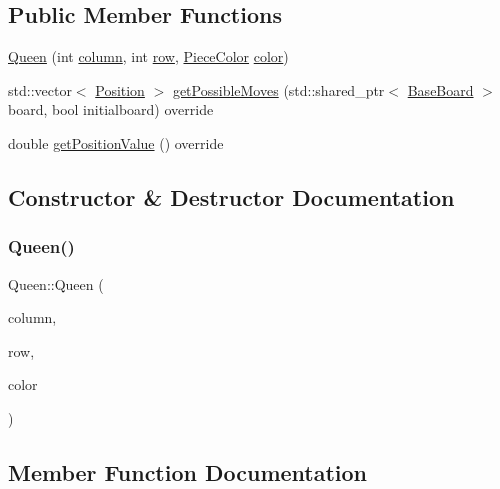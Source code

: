 \subsection*{Public Member Functions}
\begin{DoxyCompactItemize}
\item 
\hyperlink{class_queen_aa8675f82d1d05e7e457f94b897674ace}{Queen} (int \hyperlink{class_piece_aa8f39e11280395103164f6ae07398c82}{column}, int \hyperlink{class_piece_ac6ef7c474f20562cb629c2452ce0631d}{row}, \hyperlink{_piece_8h_ad7595c48bb74c0dd2a7648712a2d4985}{Piece\+Color} \hyperlink{class_piece_a8dfe0501fe95a1a7618cf5ad3b9fda69}{color})
\item 
std\+::vector$<$ \hyperlink{struct_position}{Position} $>$ \hyperlink{class_queen_a54461f7bace6797676679ad1da5901d3}{get\+Possible\+Moves} (std\+::shared\+\_\+ptr$<$ \hyperlink{class_base_board}{Base\+Board} $>$ board, bool initialboard) override
\item 
double \hyperlink{class_queen_aa2ca0d72a74a245470f502a82eaf1052}{get\+Position\+Value} () override
\end{DoxyCompactItemize}


\subsection{Constructor \& Destructor Documentation}
\mbox{\label{class_queen_aa8675f82d1d05e7e457f94b897674ace}} 
\subsubsection{\texorpdfstring{Queen()}{Queen()}}
{\footnotesize\ttfamily Queen\+::\+Queen (\begin{DoxyParamCaption}\item[{int}]{column,  }\item[{int}]{row,  }\item[{\hyperlink{_piece_8h_ad7595c48bb74c0dd2a7648712a2d4985}{Piece\+Color}}]{color }\end{DoxyParamCaption})\hspace{0.3cm}{\ttfamily [inline]}}



\subsection{Member Function Documentation}
\mbox{\label{class_queen_aa2ca0d72a74a245470f502a82eaf1052}} 

